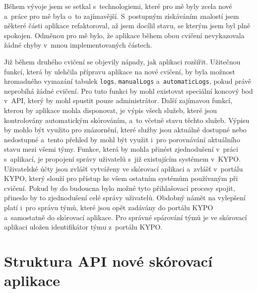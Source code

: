 \documentclass[
  digital,
  twoside,
  table, 
  nolof, 
  nolot
]{fithesis3}
\begin{document}
Během vývoje jsem se setkal s~technologiemi, které pro mě byly zcela nové a~práce pro mě byla o~to zajímavější. S~postupným získáváním znalostí jsem některé části aplikace refaktoroval, až jsem docílil stavu, se kterým jsem byl plně spokojen. Odměnou pro mě bylo, že aplikace během obou cvičení nevykazovala žádné chyby v~mnou implementovaných částech.

Již během druhého cvičení se objevily nápady, jak aplikaci rozšířit. Užitečnou funkcí, která by ulehčila přípravu aplikace na nové cvičení, by byla možnost hromadného vymazání tabulek \texttt{logs}, \texttt{manualLogs} a~\texttt{automaticLogs}, pokud právě neprobíhá žádné cvičení. Pro tuto funkci by mohl existovat speciální koncový bod v~API, který by mohl spustit pouze administrátor. Další zajímavou funkcí, kterou by aplikace mohla disponovat, je výpis všech služeb, které jsou kontrolovány automatickým skórováním, a~to včetně stavu těchto služeb. Výpisu by mohlo být využito pro znázornění, které služby jsou aktuálně dostupné nebo nedostupné a~tento přehled by mohl být využit i~pro porovnávání aktuálního stavu mezi všemi týmy. Funkce, která by mohla přinést zjednodušení v~práci s~aplikací, je propojení správy uživatelů s~již existujícím systémem v~KYPO. Uživatelské účty jsou zvlášť vytvářeny ve skórovací aplikaci a~zvlášť v~portálu KYPO, který slouží pro přístup ke všem ostatním systémům používaným při cvičení. Pokud by do budoucna bylo možné tyto přihlašovací procesy spojit, přineslo by to zjednodušení celé správy uživatelů. Obdobný námět na vylepšení platí i~pro správu týmů, které jsou opět zadávány do portálu KYPO a~samostatně do skórovací aplikace. Pro správné spárování týmů je ve skórovací aplikaci uložen identifikátor týmu z~portálu KYPO.

\printbibliography[heading=bibintoc] %

\appendix %
\chapter{Struktura API nové skórovací aplikace}
\label{appendAPI}
\end{document}
